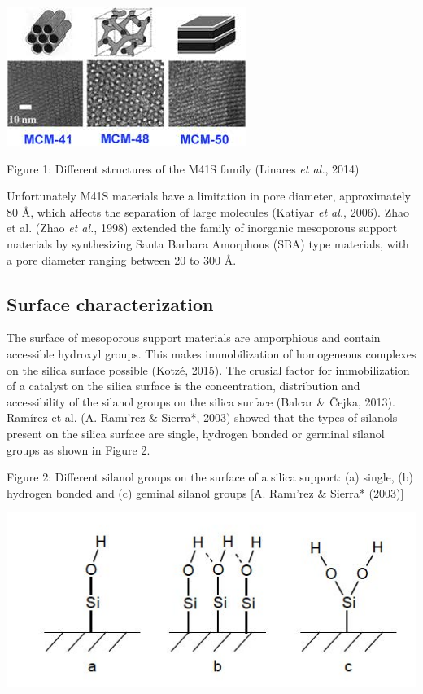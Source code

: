 \documentclass[]{article}
\begin{document}
\begin{center}\includegraphics[width=0.9\linewidth]{Data/Images/Mcm-structures} \end{center}

Figure 1: Different structures of the M41S family (Linares \emph{et
al.}, 2014)

Unfortunately M41S materials have a limitation in pore diameter,
approximately 80 Å, which affects the separation of large molecules
(Katiyar \emph{et al.}, 2006). Zhao et al. (Zhao \emph{et al.}, 1998)
extended the family of inorganic mesoporous support materials by
synthesizing Santa Barbara Amorphous (SBA) type materials, with a pore
diameter ranging between 20 to 300 Å.

\hypertarget{surface-characterization}{%
\subsection{Surface characterization}\label{surface-characterization}}

The surface of mesoporous support materials are amporphious and contain
accessible hydroxyl groups. This makes immobilization of homogeneous
complexes on the silica surface possible (Kotzé, 2015). The crusial
factor for immobilization of a catalyst on the silica surface is the
concentration, distribution and accessibility of the silanol groups on
the silica surface (Balcar \& Čejka, 2013). Ramírez et al. (A. Ramı'rez
\& Sierra*, 2003) showed that the types of silanols present on the
silica surface are single, hydrogen bonded or germinal silanol groups as
shown in Figure 2.

Figure 2: Different silanol groups on the surface of a silica support:
(a) single, (b) hydrogen bonded and (c) geminal silanol groups {[}A.
Ramı'rez \& Sierra* (2003){]}

\begin{center}\includegraphics[width=7.11in]{Data/Images/Silanol_groups} \end{center}
\end{document}

